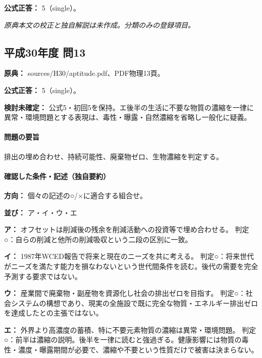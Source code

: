 \textbf{公式正答：} 5（single）。

\par\textit{原典本文の校正と独自解説は未作成。分類のみの登録項目。}

\subsection{平成30年度 問13}
\label{q:h30-reg-apt-13}

\noindent\textbf{原典：} sources/H30/aptitude.pdf、PDF物理13頁。

\textbf{公式正答：} 5（single）。

\par\textbf{検討未確定：} 公式5・初回5を保持。エ後半の生活に不要な物質の濃縮を一律に異常・環境問題とする表現は、毒性・曝露・自然濃縮を省略し一般化に疑義。

\paragraph{問題の要旨} 排出の埋め合わせ、持続可能性、廃棄物ゼロ、生物濃縮を判定する。

\paragraph{確認した条件・記述（独自要約）}\mbox{}\par

\noindent\textbf{方向：} 個々の記述の○/×に適合する組合せ。\par

\noindent\textbf{並び：} ア・イ・ウ・エ\par

\noindent\textbf{ア：} オフセットは削減後の残余を削減活動への投資等で埋め合わせる。 判定○：自らの削減と他所の削減吸収という二段の区別に一致。\par

\noindent\textbf{イ：} 1987年WCED報告で将来と現在のニーズを共に考える。 判定○：将来世代がニーズを満たす能力を損なわないという世代間条件を読む。後代の需要を完全予測する要求ではない。\par

\noindent\textbf{ウ：} 産業間で廃棄物・副産物を資源化し社会の排出ゼロを目指す。 判定○：社会システムの構想であり、現実の全施設で既に完全な物質・エネルギー排出ゼロを達成したとの主張ではない。\par

\noindent\textbf{エ：} 外界より高濃度の蓄積、特に不要元素物質の濃縮は異常・環境問題。 判定○：前半は濃縮の説明。後半を一律に読むと強過ぎる。健康影響には物質の毒性・濃度・曝露期間が必要で、濃縮や不要という性質だけで被害は決まらない。\par

